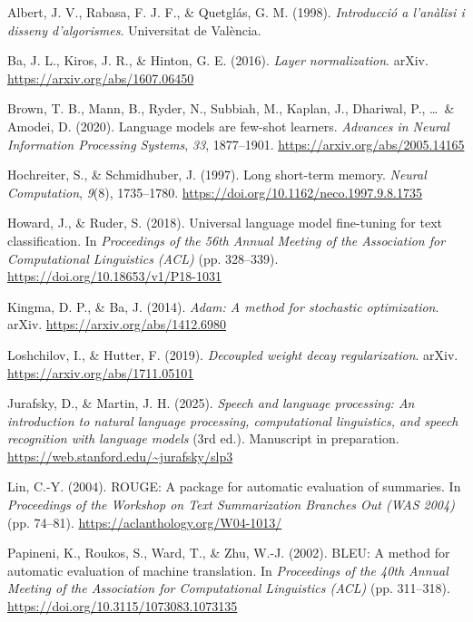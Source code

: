 \documentclass[12pt,twoside]{article}
\begin{document}
\begin{thebibliography}{100}




 Albert, J. V., Rabasa, F. J. F., \& Quetglás, G. M. (1998). \textit{Introducció a l’anàlisi i disseny d’algorismes}. Universitat de València.

 Ba, J. L., Kiros, J. R., \& Hinton, G. E. (2016). \textit{Layer normalization}. arXiv. \url{https://arxiv.org/abs/1607.06450}

 Brown, T. B., Mann, B., Ryder, N., Subbiah, M., Kaplan, J., Dhariwal, P., \ldots\ \& Amodei, D. (2020). Language models are few-shot learners. \textit{Advances in Neural Information Processing Systems}, \textit{33}, 1877--1901. \url{https://arxiv.org/abs/2005.14165}


 Hochreiter, S., \& Schmidhuber, J. (1997). Long short-term memory. \textit{Neural Computation}, \textit{9}(8), 1735--1780. \url{https://doi.org/10.1162/neco.1997.9.8.1735}

 Howard, J., \& Ruder, S. (2018). Universal language model fine-tuning for text classification. In \textit{Proceedings of the 56th Annual Meeting of the Association for Computational Linguistics (ACL)} (pp. 328--339). \url{https://doi.org/10.18653/v1/P18-1031}

 Kingma, D. P., \& Ba, J. (2014). \textit{Adam: A method for stochastic optimization}. arXiv. \url{https://arxiv.org/abs/1412.6980}

 Loshchilov, I., \& Hutter, F. (2019). \textit{Decoupled weight decay regularization}. arXiv. \url{https://arxiv.org/abs/1711.05101}

 Jurafsky, D., \& Martin, J. H. (2025). \textit{Speech and language processing: An introduction to natural language processing, computational linguistics, and speech recognition with language models} (3rd ed.). Manuscript in preparation. \url{https://web.stanford.edu/~jurafsky/slp3}

 Lin, C.-Y. (2004). ROUGE: A package for automatic evaluation of summaries. In \textit{Proceedings of the Workshop on Text Summarization Branches Out (WAS 2004)} (pp. 74--81). \url{https://aclanthology.org/W04-1013/}

 Papineni, K., Roukos, S., Ward, T., \& Zhu, W.-J. (2002). BLEU: A method for automatic evaluation of machine translation. In \textit{Proceedings of the 40th Annual Meeting of the Association for Computational Linguistics (ACL)} (pp. 311--318). \url{https://doi.org/10.3115/1073083.1073135}


\end{thebibliography}
\end{document}
